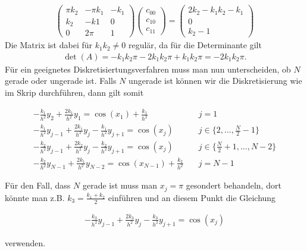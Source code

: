 \begin{solution}
\begin{itemize}
    \begin{align*}
      \left( \begin{array}{ccc}
        \pi k_2 & -\pi k_1 & - k_1 \\
        k_2 & -k1 & 0 \\
        0 & 2\pi & 1
      \end{array}
      \right) \left(
      \begin{array}{c}
        c_{00} \\
        c_{10} \\
        c_{11}
      \end{array}
      \right)
      =
      \left(
      \begin{array}{c}
      2k_2 - k_1 k_2 - k_1 \\
      0 \\
      k_2 - 1
      \end{array}
      \right)
    \end{align*}
    Die Matrix ist dabei für $k_1k_2 \neq 0$ regulär, da für die Determinante gilt
    \begin{align*}
      \det(A) = -k_1k_2\pi -2k_1k_2\pi + k_1k_2\pi = -2k_1k_2\pi.
    \end{align*}
    Für ein geeignetes Diskretisiertungsverfahren muss man nun unterscheiden, ob
    $N$ gerade oder ungerade ist. Falls $N$ ungerade ist können wir die Diskretisierung
    wie im Skrip durchführen, dann gilt somit

    \begin{align*}
      -\frac{k_1}{h^2} y_2 + \frac{2k_1}{h^2} y_1
      =
      \cos(x_1) + \frac{k_1}{h^2}
      \quad
      & j = 1 \\
      -\frac{k_1}{h^2} y_{j-1} + \frac{2k_1}{h^2} y_j - \frac{k_1}{h^2}y_{j+1}
      =
      \cos(x_j)
      \quad
      &j \in \{2, \dots, \frac{N}{2}-1\} \\
      -\frac{k_2}{h^2} y_{j-1} + \frac{2k_2}{h^2} y_j - \frac{k_2}{h^2}y_{j+1}
      =
      \cos(x_j)
      \quad
      &j \in \{\frac{N}{2}+1, \dots , N-2\} \\
      -\frac{k_2}{h^2} y_{N-1} + \frac{2k_1}{h^2} y_{N-2}
      =
      \cos(x_{N-1})+ \frac{k_2}{h^2}
      \quad
      & j = N-1
    \end{align*}

    Für den Fall, dass $N$ gerade ist muss man $x_j = \pi$ gesondert behandeln, dort
    könnte man z.B. $k_3 = \frac{k_1 +k_2}{2}$ einführen und an diesem Punkt die Gleichung

    \begin{align*}
    -\frac{k_3}{h^2} y_{j-1} + \frac{2k_3}{h^2} y_j - \frac{k_3}{h^2}y_{j+1}
    =
    \cos(x_j)
    \end{align*}

    verwenden.
  \end{itemize}
\end{solution}
